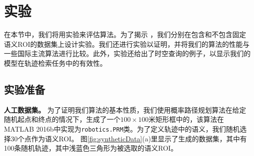 \section{实验}
在本节中，我们将用实验来评估算法。为了揭示 ，我们分别在包含和不包含固定语义ROI的数据集上设计实验。我们还进行实验以证明，并将我们的算法的性能与一些国际主流算法进行比较。此外，实验还给出了时空查询的例子，以显示我们的模型在轨迹检索任务中的有效性。

\subsection{实验准备}
\vspace{3mm}
\noindent\textbf{人工数据集。} 
为了证明我们算法的基本性质，我们使用概率路径规划算法在给定随机起点和终点的情况下，生成了一个$100\times100$米矩形框中的，该算法在 MATLAB 2016b中实现为\texttt{robotics.PRM}类。为了定义轨迹中的语义，我们随机选择30个点作为语义ROI。 图\ref{fig:syntheticData}(a)里显示了生成的数据集，其中有100条随机轨迹，其中浅蓝色三角形为被选取的语义ROI。


